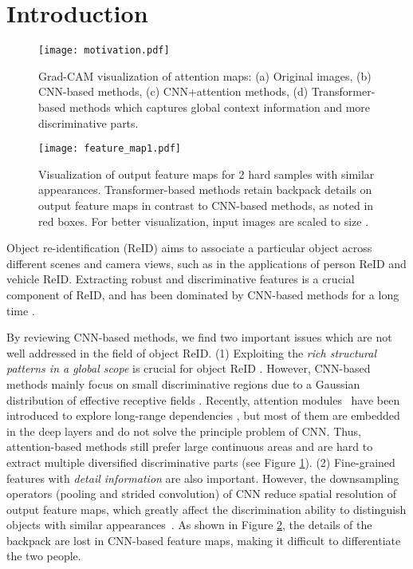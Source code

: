\documentclass[10pt,twocolumn,letterpaper]{article}
\begin{document}
\vspace{-1.5em}



\section{Introduction}

\begin{figure}[t]
    \centering
	\texttt{[image: motivation.pdf]}
	\vspace{-1.2em}
	\caption{Grad-CAM \cite{grad_cam} visualization of attention maps: (a) Original images, (b) CNN-based methods, (c) CNN+attention methods, (d) Transformer-based methods which captures global context information and more discriminative parts.}
	\vspace{-1.0em}
	\label{fig:motivation}
\end{figure}
\begin{figure}[t]
    \centering
	\texttt{[image: feature\_map1.pdf]}
	\vspace{-1.8em}
	\caption{Visualization of output feature maps for 2 hard samples with similar appearances. Transformer-based methods retain backpack details on output feature maps in contrast to CNN-based methods, as noted in red boxes. For better visualization, input images are scaled to size .}
	\vspace{-1.em}
	\label{fig:feature_map}
\end{figure}


Object re-identification (ReID) aims to associate a particular object across different scenes and camera views, such as in the applications of person ReID and vehicle ReID. Extracting robust and discriminative features is a crucial component of ReID, 
and has been dominated by CNN-based methods for a long time \cite{khorramshahi2020devil,PCB, Circle_loss, MGN, guangcongwang}. 

By reviewing CNN-based  methods, we find two important issues which are not well addressed in the field of object ReID. (1) Exploiting the \textit{rich structural patterns in a  global scope} is crucial for object ReID \cite{RGA}. However, CNN-based methods mainly focus on small discriminative regions due to a Gaussian distribution of effective receptive fields \cite{receptive_field}. 
Recently, attention modules~\cite{RGA, SCSN, ABD-Net,SONA, HACNN, MHN} have been introduced to explore long-range dependencies \cite{non_local}, but most of them are embedded in the deep layers and do not solve the principle problem of CNN. Thus, attention-based methods still prefer large continuous areas and are hard to extract multiple diversified discriminative parts (see Figure \ref{fig:motivation}). 
(2) Fine-grained features with \textit{detail information} are also important. However, the downsampling operators (\eg pooling and strided convolution) of CNN reduce spatial resolution of output feature maps, which greatly affect the discrimination ability to distinguish objects with similar appearances~\cite{PCB, luo2019bag}. As shown in Figure \ref{fig:feature_map}, the details of the backpack are lost in CNN-based feature maps, making it difficult to differentiate the two people.
\end{document}
